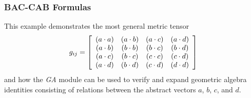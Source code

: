 \documentclass[letterpaper,10pt,english]{sphinxmanual}
\begin{document}
\subsubsection{BAC-CAB Formulas}
\label{GA:bac-cab-formulas}
This example demonstrates the most general metric tensor
\begin{equation*}
g_{ij} = \left [ \begin{array}{cccc} \left ( a\cdot a\right )  & \left ( a\cdot b\right )  & \left ( a\cdot c\right )  & \left ( a\cdot d\right )  \\
\left ( a\cdot b\right )  & \left ( b\cdot b\right )  & \left ( b\cdot c\right )  & \left ( b\cdot d\right )  \\
\left ( a\cdot c\right )  & \left ( b\cdot c\right )  & \left ( c\cdot c\right )  & \left ( c\cdot d\right )  \\
\left ( a\cdot d\right )  & \left ( b\cdot d\right )  & \left ( c\cdot d\right )  & \left ( d\cdot d\right )
\end{array}\right ]
\end{equation*}
and how the \emph{GA} module can be used to verify and expand geometric algebra identities consisting of relations between
the abstract vectors $a$, $b$, $c$, and $d$.
\end{document}
